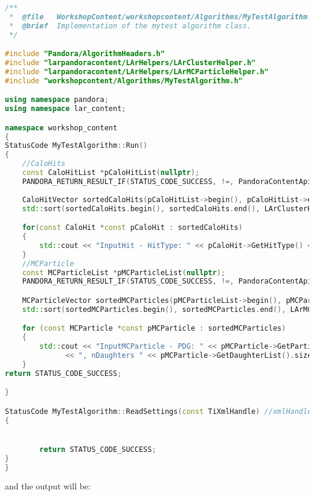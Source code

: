 \begin{lstlisting}[language=C++, caption= MyTestAlgorithm.cc including for the first time MCParticles,label=code:mcpart_first]
/**
 *  @file   WorkshopContent/workshopcontent/Algorithms/MyTestAlgorithm.cc
 *  @brief  Implementation of the mytest algorithm class.
 */

#include "Pandora/AlgorithmHeaders.h"
#include "larpandoracontent/LArHelpers/LArClusterHelper.h"
#include "larpandoracontent/LArHelpers/LArMCParticleHelper.h"
#include "workshopcontent/Algorithms/MyTestAlgorithm.h"

using namespace pandora;
using namespace lar_content;

namespace workshop_content
{
StatusCode MyTestAlgorithm::Run()
{
	//CaloHits
	const CaloHitList *pCaloHitList(nullptr);
	PANDORA_RETURN_RESULT_IF(STATUS_CODE_SUCCESS, !=, PandoraContentApi::GetCurrentList(*this, pCaloHitList));
	
	CaloHitVector sortedCaloHits(pCaloHitList->begin(), pCaloHitList->end());
	std::sort(sortedCaloHits.begin(), sortedCaloHits.end(), LArClusterHelper::SortHitsByPosition);

	for(const CaloHit *const pCaloHit : sortedCaloHits)
	{
		std::cout << "InputHit - HitType: " << pCaloHit->GetHitType() << ", " << pCaloHit->GetPositionVector() << std::endl;
	}
	//MCParticle
	const MCParticleList *pMCParticleList(nullptr);
	PANDORA_RETURN_RESULT_IF(STATUS_CODE_SUCCESS, !=, PandoraContentApi::GetCurrentList(*this, pMCParticleList));

	MCParticleVector sortedMCParticles(pMCParticleList->begin(), pMCParticleList->end());
	std::sort(sortedMCParticles.begin(), sortedMCParticles.end(), LArMCParticleHelper::SortByMomentum);

	for (const MCParticle *const pMCParticle : sortedMCParticles)
	{
		std::cout << "InputMCParticle - PDG: " << pMCParticle->GetParticleId() << ", nParents " << pMCParticle->GetParentList().size()
			  << ", nDaughters " << pMCParticle->GetDaughterList().size() << std::endl;
	}
return STATUS_CODE_SUCCESS;

}

StatusCode MyTestAlgorithm::ReadSettings(const TiXmlHandle) //xmlHandle)
{


        return STATUS_CODE_SUCCESS;
}
}
\end{lstlisting}

and the output will be:

